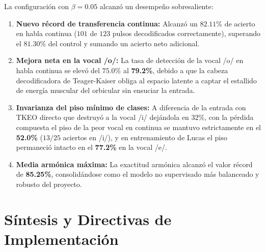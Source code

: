 \documentclass[11pt,a4paper]{article}
\begin{document}
La configuración con $\beta = 0.05$ alcanzó un desempeño sobresaliente:
\begin{enumerate}
    \item \textbf{Nuevo récord de transferencia continua:} Alcanzó un $82.11\%$ de acierto en habla continua ($101$ de $123$ pulsos decodificados correctamente), superando el $81.30\%$ del control y sumando un acierto neto adicional.
    \item \textbf{Mejora neta en la vocal /o/:} La tasa de detección de la vocal /o/ en habla continua se elevó del $75.0\%$ al \textbf{79.2\%}, debido a que la cabeza decodificadora de Teager-Kaiser obliga al espacio latente a captar el estallido de energía muscular del orbicular sin ensuciar la entrada.
    \item \textbf{Invarianza del piso mínimo de clases:} A diferencia de la entrada con TKEO directo que destruyó a la vocal /i/ dejándola en 32\%, con la pérdida compuesta el piso de la peor vocal en continua se mantuvo estrictamente en el \textbf{52.0\%} ($13/25$ aciertos en /i/), y en entrenamiento de Lucas el piso permaneció intacto en el \textbf{77.2\%} en la vocal /e/.
    \item \textbf{Media armónica máxima:} La exactitud armónica alcanzó el valor récord de \textbf{85.25\%}, consolidándose como el modelo no supervisado más balanceado y robusto del proyecto.
\end{enumerate}

\section{Síntesis y Directivas de Implementación}
\label{sec:sintesis}
\end{document}
